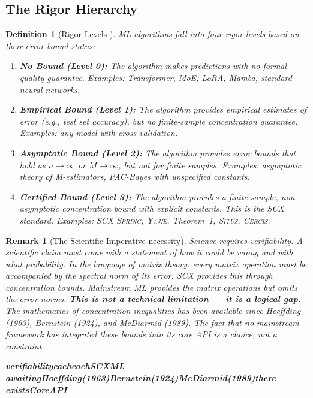 \documentclass[12pt,a4paper]{article}
\newtheorem{definition}[theorem]{Definition}
\newtheorem{remark}[theorem]{Remark}
\theoremstyle{definition}
\newcommand{\Situs}{\textsc{Situs}}
\newcommand{\Yajie}{\textsc{Yajie}}
\newcommand{\Spring}{\textsc{Spring}}
\newcommand{\Cercis}{\textsc{Cercis}}
\newcommand{\SCX}{\textsc{SCX}}
\begin{document}
\subsection{The Rigor Hierarchy }

\begin{definition}[Rigor Levels ]\label{def:rigor_levels}
ML algorithms fall into four rigor levels based on their error bound status:
\begin{enumerate}[label=\textbf{Level \arabic*:}, nosep]
    \item \textbf{No Bound (Level 0):} The algorithm makes predictions with no formal 
    quality guarantee. Examples: Transformer, MoE, LoRA, Mamba, standard neural networks.
    
    \item \textbf{Empirical Bound (Level 1):} The algorithm provides empirical estimates 
    of error (e.g., test set accuracy), but no finite-sample concentration guarantee. 
    Examples: any model with cross-validation.
    
    \item \textbf{Asymptotic Bound (Level 2):} The algorithm provides error bounds that 
    hold as $n \to \infty$ or $M \to \infty$, but not for finite samples. Examples: 
    asymptotic theory of M-estimators, PAC-Bayes with unspecified constants.
    
    \item \textbf{Certified Bound (Level 3):} The algorithm provides a finite-sample, 
    non-asymptotic concentration bound with explicit constants. This is the \SCX{} 
    standard. Examples: \SCX{} \Spring{}, \Yajie{}, Theorem~1, \Situs{}, \Cercis{}.
\end{enumerate}
\end{definition}

\begin{remark}[The Scientific Imperative necessity]
\label{rem:scientific_imperative}
Science requires verifiability. A scientific claim must come with a statement of how 
it could be wrong and with what probability. In the language of matrix theory: every 
matrix operation must be accompanied by the spectral norm of its error. \SCX{} provides 
this through concentration bounds. Mainstream ML provides the matrix operations but 
omits the error norms. \textbf{This is not a technical limitation — it is a logical 
gap.} The mathematics of concentration inequalities has been available since Hoeffding 
(1963), Bernstein (1924), and McDiarmid (1989). The fact that no mainstream framework 
has integrated these bounds into its core API is a choice, not a constraint.

\medskip
\noindent\textbf{verifiabilityeacheachSCXML---awaitingHoeffding(1963)Bernstein(1924)McDiarmid(1989)there existsCoreAPI}
\end{remark}
\end{document}
